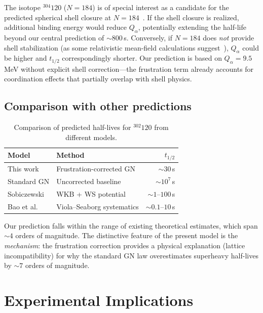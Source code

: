 \documentclass[aps,prc,twocolumn,showpacs,preprintnumbers,amsmath,amssymb]{revtex4-2}
\newcommand{\thalf}{t_{1/2}}
\newcommand{\Qalpha}{Q_\alpha}
\begin{document}
The isotope ${}^{304}120$ ($N = 184$) is of special interest
as a candidate for the predicted spherical shell closure at
$N = 184$~\cite{Sobiczewski2007,Bender2003}.  If the shell
closure is realized, additional binding energy would reduce
$\Qalpha$, potentially extending the half-life beyond our
central prediction of $\sim 800$\,s.
Conversely, if $N = 184$ does \emph{not} provide shell
stabilization (as some relativistic mean-field calculations
suggest~\cite{Afanasjev2013}), $\Qalpha$ could be higher
and $\thalf$ correspondingly shorter.
Our prediction is based on $\Qalpha = 9.5$\,MeV without
explicit shell correction---the frustration term already
accounts for coordination effects that partially overlap
with shell physics.

\subsection{Comparison with other predictions}

\begin{table}[h]
\centering
\caption{Comparison of predicted half-lives for ${}^{302}120$
  from different models.}
\label{tab:comparison}
\begin{tabular}{@{}llr@{}}
\toprule
Model & Method & $\thalf$ \\
\midrule
This work & Frustration-corrected GN & $\sim 30$\,s \\
Standard GN & Uncorrected baseline & $\sim 10^7$\,s \\
Sobiczewski~\cite{Sobiczewski2018} & WKB + WS potential & $\sim 1$--$100$\,s \\
Bao et al.~\cite{Bao2015} & Viola--Seaborg systematics & $\sim 0.1$--$10$\,s \\
\bottomrule
\end{tabular}
\end{table}

Our prediction falls within the range of existing theoretical
estimates, which span $\sim 4$ orders of magnitude.  The
distinctive feature of the present model is the
\emph{mechanism}: the frustration correction provides a
physical explanation (lattice incompatibility) for why the
standard GN law overestimates superheavy half-lives by
$\sim 7$ orders of magnitude.

\section{Experimental Implications}
\label{sec:experiment}
\end{document}
